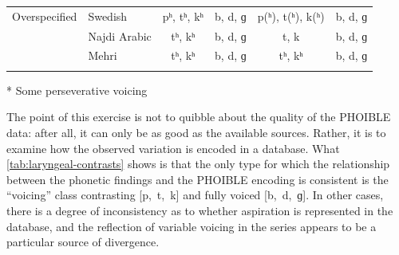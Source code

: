 \documentclass[output=paper,colorlinks,citecolor=brown]{langscibook}
\begin{document}
\begin{table}
\begin{threeparttable}
\begin{tabularx}{.85\textheight}{Xlcccc}
    \midrule
    Overspecified     & Swedish          & pʰ, tʰ, kʰ                   & b, d, ɡ                      & p(ʰ), t(ʰ), k(ʰ) & b, d, ɡ  \\
                      & Najdi Arabic     & tʰ, kʰ                      & b, d, ɡ                      & t, k            & b, d, ɡ  \\
                      & Mehri            & tʰ, kʰ                      & b, d, ɡ                      & tʰ, kʰ          & b, d, ɡ  \\
    \lspbottomrule
  \end{tabularx}
  \begin{tablenotes}
    \item [*] Some perseverative voicing
  \end{tablenotes}
\end{threeparttable}
\end{table}


The point of this exercise is not to quibble about the quality of the PHOIBLE data: after all, it can only be as good as the available sources. Rather, it is to examine how the observed variation is encoded in a database. What \cref{tab:laryngeal-contrasts} shows is that the only type for which the relationship between the phonetic findings and the PHOIBLE encoding is consistent is the \enquote{voicing} class contrasting {\VOICELESS} [p,~t,~k] and fully voiced [b,~d,~ɡ]. In other cases, there is a degree of inconsistency as to whether aspiration is represented in the database, and the reflection of variable voicing in the {\VOICED} series appears to be a particular source of divergence.
\end{document}
